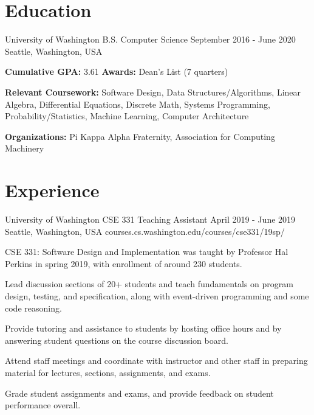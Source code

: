 \documentclass{resume}
\begin{document}
\maketitle

\section{Education}

\school
{University of Washington}
{B.S. Computer Science}
{September 2016 - June 2020}
{Seattle, Washington, USA}
{\textbf{Cumulative GPA:} 3.61 \blt \textbf{Awards:} Dean's List (7 quarters)

  \textbf{Relevant Coursework:} Software Design, Data Structures/Algorithms, 
  Linear Algebra, Differential Equations, Discrete Math, Systems Programming,
  Probability/Statistics, Machine Learning, Computer Architecture

  \textbf{Organizations:} Pi Kappa Alpha Fraternity, Association for Computing
  Machinery
}

\section{Experience}


\job
{University of Washington}
{CSE 331 Teaching Assistant}
{April 2019 - June 2019}
{Seattle, Washington, USA}
{courses.cs.washington.edu/courses/cse331/19sp/}
{
  CSE 331: Software Design and Implementation was taught by Professor Hal 
  Perkins in spring 2019, with enrollment of around 230 students.
  \begin{overview}
    \item Lead discussion sections of 20+ students and teach fundamentals on
          program design, testing, and specification, along with event-driven
          programming and some code reasoning.
    \item Provide tutoring and assistance to students by hosting office hours
          and by answering student questions on the course discussion board.
    \item Attend staff meetings and coordinate with instructor and other staff 
          in preparing material for lectures, sections, assignments, and exams.
    \item Grade student assignments and exams, and provide feedback on student 
          performance overall.
  \end{overview}
}
\end{document}
